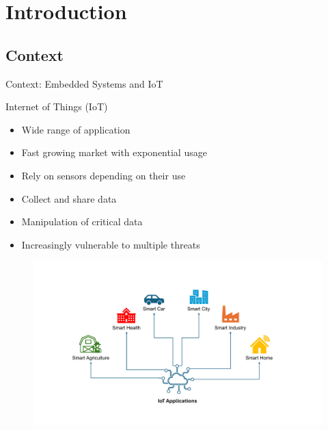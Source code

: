 \section{Introduction}

\subsection{Context}
\begin{frame}{Context: Embedded Systems and IoT}
	\begin{minipage}[c]{0.5\textwidth}
        \begin{block}{Internet of Things (IoT)}
            \begin{itemize}
                [square]
                \justifying
                \item Wide range of application
                \item Fast growing market with exponential usage
                \item Rely on sensors depending on their use
                \item Collect and share data
                \item Manipulation of critical data
                \item Increasingly vulnerable to multiple threats
            \end{itemize}
        \end{block}
	\end{minipage}\hfill%
	\begin{minipage}[c]{0.5\textwidth}
		\begin{figure}
			\centering
			\includegraphics[width=.825\textwidth, trim={4.5cm 2.25cm 5.75cm 3.25cm}, clip]{src/1_introduction/img/iotapplications.pdf}
			\label{fig:iot_application}

\end{figure}
\end{minipage}
\end{frame}
